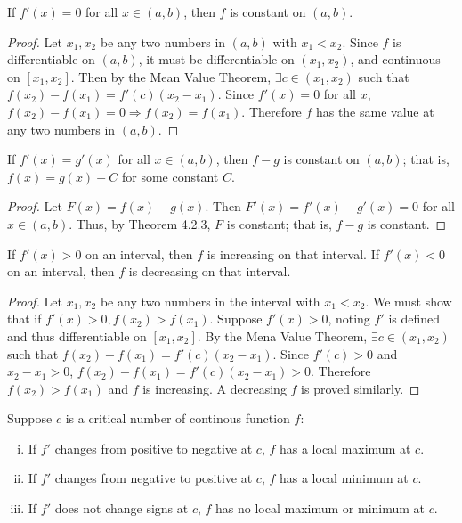 \documentclass[a4paper,8pt]{article}
\begin{document}
\begin{outline}
    If \(f'(x) = 0\) for all \(x \in (a, b)\), then \(f\) is constant on \((a, b)\).

    \begin{proof}
      Let \(x_1, x_2\) be any two numbers in \((a, b)\) with \(x_1 < x_2\). Since \(f\) is differentiable on
      \((a, b)\), it must be differentiable on \((x_1, x_2)\), and continuous on \([x_1, x_2]\). Then by
      the Mean Value Theorem, \(\exists c \in (x_1, x_2)\) such that \(f(x_2)-f(x_1) = f'(c)(x_2-x_1)\).
      Since \(f'(x) = 0\) for all \(x\), \(f(x_2) - f(x_1) = 0 \Rightarrow f(x_2) = f(x_1)\). Therefore
      \(f\) has the same value at any two numbers in \((a, b)\).
    \end{proof}

    If \(f'(x) = g'(x)\) for all \(x \in (a, b)\), then \(f-g\) is constant on \((a, b)\); that is, \(f(x)=g(x)+C\)
    for some constant \(C\).

    \begin{proof}
      Let \(F(x) = f(x)-g(x)\). Then \(F'(x) = f'(x)-g'(x) = 0\) for all \(x \in (a, b)\). Thus, by Theorem 4.2.3,
      \(F\) is constant; that is, \(f-g\) is constant.
    \end{proof}

    If \(f'(x) > 0\) on an interval, then \(f\) is increasing on that interval. If \(f'(x) < 0\) on an interval,
    then \(f\) is decreasing on that interval.

    \begin{proof}
      Let \(x_1, x_2\) be any two numbers in the interval with \(x_1 < x_2\). We must show that if \(f'(x) > 0,
      f(x_2) > f(x_1)\). Suppose \(f'(x) > 0\), noting \(f'\) is defined and thus differentiable on \([x_1, x_2]\).
      By the Mena Value Theorem, \(\exists c \in (x_1, x_2)\) such that \(f(x_2)-f(x_1)=f'(c)(x_2-x_1)\). Since
      \(f'(c) > 0\) and \(x_2-x_1 > 0\), \(f(x_2)-f(x_1) = f'(c)(x_2-x_1) > 0\). Therefore \(f(x_2) > f(x_1)\)
      and \(f\) is increasing. A decreasing \(f\) is proved similarly.
    \end{proof}

    Suppose \(c\) is a critical number of continous function \(f\):
    \begin{enumerate}[i.]
      \item If \(f'\) changes from positive to negative at \(c\), \(f\) has a local maximum at \(c\).
      \item If \(f'\) changes from negative to positive at \(c\), \(f\) has a local minimum at \(c\).
      \item If \(f'\) does not change signs at \(c\), \(f\) has no local maximum or minimum at \(c\).
    \end{enumerate}


\end{outline}
\end{document}
